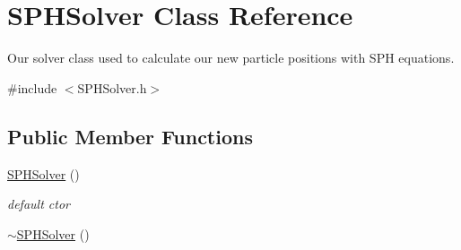 \hypertarget{classSPHSolver}{\section{S\-P\-H\-Solver Class Reference}
\label{classSPHSolver}
}


Our solver class used to calculate our new particle positions with S\-P\-H equations.  




{\ttfamily \#include $<$S\-P\-H\-Solver.\-h$>$}

\subsection*{Public Member Functions}
\begin{DoxyCompactItemize}
\item 
\hypertarget{classSPHSolver_abe3a0bdf9c42b4213944bc0332020e65}{\hyperlink{classSPHSolver_abe3a0bdf9c42b4213944bc0332020e65}{S\-P\-H\-Solver} ()}\label{classSPHSolver_abe3a0bdf9c42b4213944bc0332020e65}

\begin{DoxyCompactList}\small\item\em default ctor \end{DoxyCompactList}\item 
\hypertarget{classSPHSolver_a81a0ee1c05b649912faa1e9839f71883}{\hyperlink{classSPHSolver_a81a0ee1c05b649912faa1e9839f71883}{$\sim$\-S\-P\-H\-Solver} ()}\label{classSPHSolver_a81a0ee1c05b649912faa1e9839f71883}


\end{DoxyCompactItemize}
